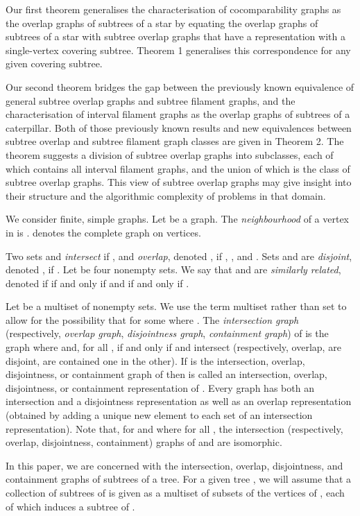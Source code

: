 \documentclass[
final
]{dmtcs-episciences}        \usepackage{graphics, amsthm, amsmath, amssymb, algorithm, algorithmic}
\begin{document}
Our first theorem generalises the characterisation of cocomparability graphs as the overlap graphs of subtrees of a star by equating the overlap graphs of subtrees of a star with subtree overlap graphs that have a representation with a single-vertex covering subtree. Theorem 1 generalises this correspondence for any given covering subtree.

Our second theorem bridges the gap between the previously known equivalence of general subtree overlap graphs and subtree filament graphs, and the characterisation of interval filament graphs as the overlap graphs of subtrees of a caterpillar. Both of those previously known results and new equivalences between subtree overlap and subtree filament graph classes are given in Theorem 2. The theorem suggests a division of subtree overlap graphs into subclasses,
each of which contains all interval filament graphs, and the union of which
is the class of subtree overlap graphs. 
This view of subtree overlap graphs may give insight into their structure and the algorithmic complexity of problems in that domain. 

We consider finite, simple graphs. Let  be a graph.
The {\em neighbourhood} of a vertex  in  is .
 denotes the complete graph on  vertices.

Two sets  and  {\em intersect} if , and
{\em overlap}, denoted , if , , and . Sets  and  are {\em disjoint}, denoted , if .
Let  be four nonempty sets.  We say that  and  are \emph{similarly related}, denoted  if  if and only if  and  if and only if . 

Let  be a multiset of nonempty sets. We use the term multiset rather than set to allow for the possibility that  for some  where . The {\em intersection graph} 
(respectively, {\em overlap graph}, {\em disjointness graph}, {\em containment graph}) of  is the graph  where  and, for all ,  if and only if  and  intersect (respectively, overlap, are disjoint, are contained one in the other). 
If  is the intersection,
overlap, disjointness, or containment graph of  then  is
called an intersection, overlap, disjointness, or containment representation
of . Every graph has both an intersection and a disjointness
representation \cite{Marcz} as well as an overlap representation (obtained
by adding a unique new element to each set of
an intersection representation). 
Note
that, for  and 
 where
 for all ,
the intersection (respectively,
overlap, disjointness, containment) graphs of  and  are
isomorphic.

In this paper, we are concerned with the intersection, overlap, disjointness, and containment graphs of subtrees of a tree. For a given tree , we will assume that a collection of  subtrees of  is given as a multiset  of subsets of the vertices of , each of which induces a subtree of .
\end{document}
